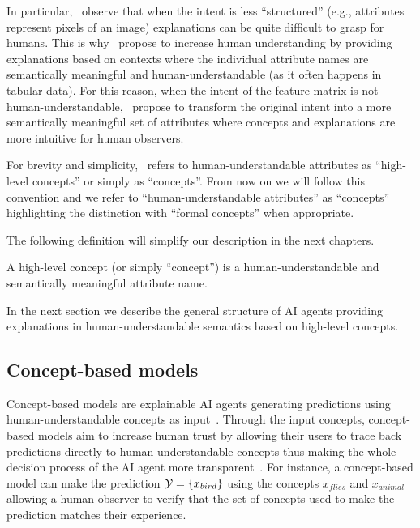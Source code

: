 In particular,~\citet{kim2018interpretability} observe that when the intent is less ``structured'' (e.g., attributes represent pixels of an image) explanations can be quite difficult to grasp for humans. This is why~\citet{kim2018interpretability} propose to increase human understanding by providing explanations based on contexts where the individual attribute names are semantically meaningful and human-understandable (as it often happens in tabular data). For this reason, when the intent of the feature matrix is not human-understandable,~\citet{kim2018interpretability} propose to transform the original intent into a more semantically meaningful set of attributes where concepts and explanations are more intuitive for human observers. 
\begin{remark}
    For brevity and simplicity,~\citet{kim2018interpretability} refers to human-understandable attributes as ``high-level concepts'' or simply as ``concepts''. From now on we will follow this convention and we refer to ``human-understandable attributes'' as ``concepts'' highlighting the distinction with ``formal concepts'' when appropriate.
\end{remark}
The following definition will simplify our description in the next chapters.
\begin{definition}
    A high-level concept (or simply ``concept'') is a human-understandable and semantically meaningful attribute name.
\end{definition}
In the next section we describe the general structure of AI agents providing explanations in human-understandable semantics based on high-level concepts.

\subsection{Concept-based models}
Concept-based models are explainable AI agents generating predictions using human-understandable concepts as input~\cite{kim2018interpretability,chen2020concept,koh2020concept}. Through the input concepts, concept-based models aim to increase human trust by allowing their users to trace back predictions directly to human-understandable concepts thus making the whole decision process of the AI agent more transparent~\cite{rudin2019stop,shen2022trust}. For instance, a concept-based model can make the prediction $\mathcal{Y}=\{x_{bird}\}$ using the concepts $x_{flies}$ and $x_{animal}$ allowing a human observer to verify that the set of concepts used to make the prediction matches their experience.


